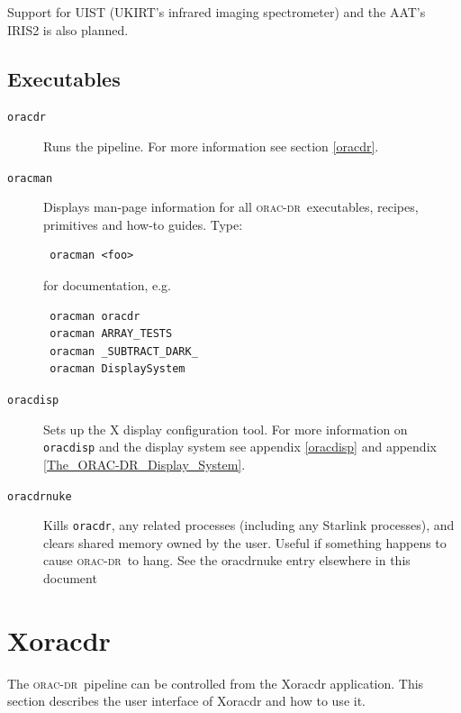\documentclass[twoside,11pt]{article}
\renewcommand{\_}{\texttt{\symbol{95}}}
\newcommand{\oracdr}{\textsc{orac-dr}}
\begin{document}
Support for UIST (UKIRT's infrared imaging spectrometer) and the
AAT's IRIS2 is also planned.

\subsection*{Executables\label{ORAC-DR_Components_Executables}}
\begin{description}
\item[\texttt{oracdr}] \mbox{}

Runs the pipeline. For more information see section \ref{oracdr}.

\item[\texttt{oracman}] \mbox{}

Displays man-page information for all \oracdr\ executables, recipes,
primitives and how-to guides. Type:

\begin{verbatim}
 oracman <foo>
\end{verbatim}


for documentation, e.g.

\begin{verbatim}
 oracman oracdr
 oracman ARRAY_TESTS
 oracman _SUBTRACT_DARK_
 oracman DisplaySystem
\end{verbatim}
\item[\texttt{oracdisp}] \mbox{}

Sets up the X display configuration tool. For more information on
\texttt{oracdisp} and the display system see appendix \ref{oracdisp} and appendix \ref{The_ORAC-DR_Display_System}.

\item[\texttt{oracdr\_nuke}] \mbox{}

Kills \texttt{oracdr}, any related processes (including any Starlink
processes), and clears shared memory owned by the user. Useful if
something happens to cause \oracdr\ to hang. See the \textsf{oracdr\_nuke}
 entry elsewhere in this document

\end{description}

\section{Xoracdr\label{Xoracdr}}

The \oracdr\ pipeline can be controlled from the Xoracdr
application. This section describes the user interface of Xoracdr and how
to use it.
\end{document}
